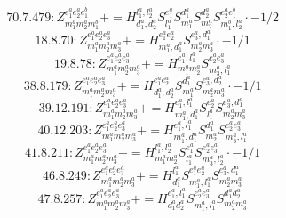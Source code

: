 \documentclass[letterpaper,10pt,fleqn,leqno,onecolumn]{article}
\begin{document}
\begin{equation} \;\;\;\;\;\;  70.7.479: Z^{e_{1}^{a}e_{2}^{a}e_{1}^{b}}_{m_{1}^{a}m_{2}^{a}m_{1}^{b}}+=H^{l_{1}^{a},l_{2}^{a}}_{d_{1}^{a},d_{2}^{a}}S^{e_{1}^{a}}_{l_{1}^{a}}S^{d_{1}^{a}}_{m_{1}^{a}}S^{d_{2}^{a}}_{m_{2}^{a}}S^{e_{2}^{a}e_{1}^{b}}_{m_{1}^{b},l_{2}^{a}}\cdot -1/2 \end{equation}
\begin{equation} \;\;\;\;\;\;  18.8.70: Z^{e_{1}^{a}e_{2}^{a}e_{3}^{a}}_{m_{1}^{a}m_{2}^{a}m_{3}^{a}}+=H^{e_{1}^{a}e_{2}^{a}}_{m_{1}^{a},d_{1}^{a}}S^{e_{3}^{a},d_{1}^{a}}_{m_{2}^{a}m_{3}^{a}}\cdot -1/1 \end{equation}
\begin{equation} \;\;\;\;\;\;  19.8.78: Z^{e_{1}^{a}e_{2}^{a}e_{3}^{a}}_{m_{1}^{a}m_{2}^{a}m_{3}^{a}}+=H^{e_{1}^{a},l_{1}^{a}}_{m_{1}^{a}m_{2}^{a}}S^{e_{2}^{a}e_{3}^{a}}_{m_{3}^{a},l_{1}^{a}} \end{equation}
\begin{equation} \;\;\;\;\;\;  38.8.179: Z^{e_{1}^{a}e_{2}^{a}e_{3}^{a}}_{m_{1}^{a}m_{2}^{a}m_{3}^{a}}+=H^{e_{1}^{a}e_{2}^{a}}_{d_{1}^{a},d_{2}^{a}}S^{d_{1}^{a}}_{m_{1}^{a}}S^{e_{3}^{a},d_{2}^{a}}_{m_{2}^{a}m_{3}^{a}}\cdot -1/1 \end{equation}
\begin{equation} \;\;\;\;\;\;  39.12.191: Z^{e_{1}^{a}e_{2}^{a}e_{3}^{a}}_{m_{1}^{a}m_{2}^{a}m_{3}^{a}}+=H^{e_{1}^{a},l_{1}^{a}}_{m_{1}^{a},d_{1}^{a}}S^{e_{2}^{a}}_{l_{1}^{a}}S^{e_{3}^{a},d_{1}^{a}}_{m_{2}^{a}m_{3}^{a}} \end{equation}
\begin{equation} \;\;\;\;\;\;  40.12.203: Z^{e_{1}^{a}e_{2}^{a}e_{3}^{a}}_{m_{1}^{a}m_{2}^{a}m_{3}^{a}}+=H^{e_{1}^{a},l_{1}^{a}}_{m_{1}^{a},d_{1}^{a}}S^{d_{1}^{a}}_{m_{2}^{a}}S^{e_{2}^{a}e_{3}^{a}}_{m_{3}^{a},l_{1}^{a}} \end{equation}
\begin{equation} \;\;\;\;\;\;  41.8.211: Z^{e_{1}^{a}e_{2}^{a}e_{3}^{a}}_{m_{1}^{a}m_{2}^{a}m_{3}^{a}}+=H^{l_{1}^{a},l_{2}^{a}}_{m_{1}^{a}m_{2}^{a}}S^{e_{1}^{a}}_{l_{1}^{a}}S^{e_{2}^{a}e_{3}^{a}}_{m_{3}^{a},l_{2}^{a}}\cdot -1/1 \end{equation}
\begin{equation} \;\;\;\;\;\;  46.8.249: Z^{e_{1}^{a}e_{2}^{a}e_{3}^{a}}_{m_{1}^{a}m_{2}^{a}m_{3}^{a}}+=H^{l_{1}^{a}}_{d_{1}^{a}}S^{e_{1}^{a}e_{2}^{a}}_{m_{1}^{a},l_{1}^{a}}S^{e_{3}^{a},d_{1}^{a}}_{m_{2}^{a}m_{3}^{a}} \end{equation}
\begin{equation} \;\;\;\;\;\;  47.8.257: Z^{e_{1}^{a}e_{2}^{a}e_{3}^{a}}_{m_{1}^{a}m_{2}^{a}m_{3}^{a}}+=H^{e_{1}^{a},l_{1}^{a}}_{d_{1}^{a}d_{2}^{a}}S^{e_{2}^{a}e_{3}^{a}}_{m_{1}^{a},l_{1}^{a}}S^{d_{1}^{a}d_{2}^{a}}_{m_{2}^{a}m_{3}^{a}} \end{equation}
\end{document}
